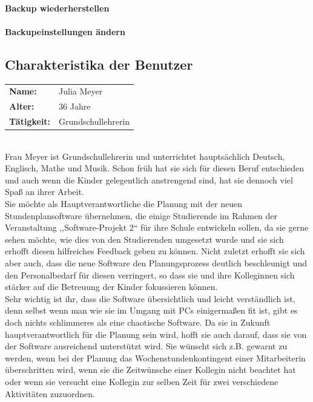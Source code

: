 \documentclass[fontsize=12pt,paper=a4,twoside]{scrartcl}
\begin{document}
\paragraph{Backup wiederherstellen}

\paragraph{Backupeinstellungen \"andern}


\subsection{Charakteristika der Benutzer}

\begin{tabular}{p{3cm}l}
\textbf{Name:} & Julia Meyer \\
\textbf{Alter:} & 36 Jahre\\
\textbf{Tätigkeit:} &  Grundschullehrerin\\
\end{tabular} \\

Frau Meyer ist Grundschullehrerin und unterrichtet hauptsächlich Deutsch, Englisch, Mathe und Musik. Schon früh hat sie sich für diesen Beruf entschieden und auch wenn die Kinder gelegentlich anstrengend sind, hat sie dennoch viel Spaß an ihrer Arbeit.\\
Sie möchte als Hauptverantwortliche die Planung mit der neuen Stundenplansoftware übernehmen, die einige Studierende im Rahmen der Veranstaltung ,,Software-Projekt 2`` für ihre Schule entwickeln sollen, da sie gerne sehen möchte, wie dies von den Studierenden umgesetzt wurde und sie sich erhofft diesen hilfreiches Feedback geben zu können. Nicht zuletzt erhofft sie sich aber auch, dass die neue Software den Planungsprozess deutlich beschleunigt und den Personalbedarf für diesen verringert, so dass sie und ihre Kolleginnen sich stärker auf die Betreuung der Kinder fokussieren können.  \\
Sehr wichtig ist ihr, dass die Software übersichtlich und leicht verständlich ist, denn selbst wenn man wie sie im Umgang mit PCs einigermaßen fit ist, gibt es doch nichts schlimmeres als eine chaotische Software. Da sie in Zukunft hauptverantwortlich für die Planung sein wird, hofft sie auch darauf, dass sie von der Software ausreichend unterstützt wird. Sie wünscht sich z.B. gewarnt zu werden, wenn bei der Planung das Wochenstundenkontingent einer Mitarbeiterin überschritten wird, wenn sie die Zeitwünsche einer Kollegin nicht beachtet hat oder wenn sie versucht eine Kollegin zur selben Zeit für zwei verschiedene Aktivitäten zuzuordnen. \\
\end{document}
